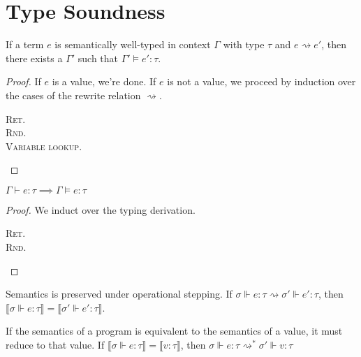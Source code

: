 \section{Type Soundness}
\begin{theorem}
If a term $e$ is semantically well-typed in context $\Gamma$ with type $\tau$ and $e \rightsquigarrow e'$, then there exists a $\Gamma'$ such that $\Gamma' \vDash e' : \tau$.
\end{theorem}
\begin{proof}
If $e$ is a value, we're done. 
If $e$ is not a value, we proceed by induction over the cases of the rewrite relation
$\rightsquigarrow$.
\begin{description}
  \item[\textsc{Ret.}]
  \item[\textsc{Rnd.}]
  \item[\textsc{Variable lookup.}]
\end{description}
\end{proof}

\begin{theorem}
$\Gamma \vdash e : \tau \implies \Gamma \vDash e : \tau$
\end{theorem}
\begin{proof}
We induct over the typing derivation.
\begin{description}
  \item[\textsc{Ret.}]
  \item[\textsc{Rnd.}]
\end{description}
\end{proof}




Semantics is preserved under operational stepping. If $\sigma \Vdash e : \tau \rightsquigarrow \sigma'
\Vdash e' : \tau$, then $\llbracket \sigma \Vdash e : \tau \rrbracket =
\llbracket \sigma' \Vdash e' : \tau \rrbracket$.

If the semantics of a program is equivalent to the semantics of a value, it must
reduce to that value. If $\llbracket \sigma \Vdash e : \tau \rrbracket =
\llbracket v : \tau \rrbracket$, then $\sigma \Vdash e : \tau
\rightsquigarrow^{*} \sigma' \Vdash v : \tau$

